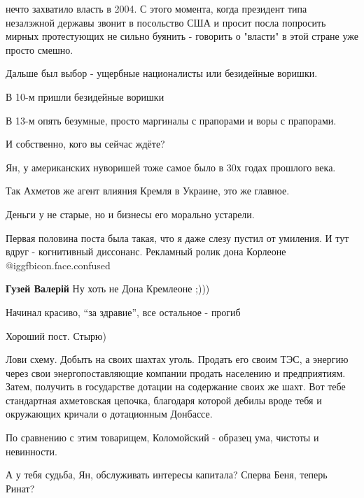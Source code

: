 \begin{itemize}
\begin{itemize}
нечто захватило власть в 2004. С этого момента, когда президент типа незалэжной
державы звонит в посольство США и просит посла попросить мирных протестующих не
сильно буянить - говорить о "власти" в этой стране уже просто смешно.

Дальше был выбор - ущербные националисты или безидейные воришки.

В 10-м пришли безидейные воришки

В 13-м опять безумные, просто маргиналы с прапорами и воры с прапорами.

И собственно, кого вы сейчас ждёте?

\end{itemize} %

Ян, у американских нуворишей тоже самое было в 30х годах прошлого века.


Так Ахметов же агент влияния Кремля в Украине, это же главное.

Деньги у не старые, но и бизнесы его морально устарели.


Первая половина поста была такая, что я даже слезу пустил от умиления. И тут
вдруг - когнитивный диссонанс. Рекламный ролик дона Корлеоне  @igg{fbicon.face.confused} 

\begin{itemize} %
\textbf{Гузей Валерій}
Ну хоть не Дона Кремлеоне ;)))
\end{itemize} %

Начинал красиво, \enquote{за здравие}, все остальное - прогиб

Хороший пост.
Стырю)


Лови схему. Добыть на своих шахтах уголь. Продать его своим ТЭС, а энергию
через свои энергопоставляющие компании продать населению и предприятиям. Затем,
получить в государстве дотации на содержание своих же шахт. Вот тебе
стандартная ахметовская цепочка, благодаря которой дебилы вроде тебя и
окружающих кричали о дотационным Донбассе.

По сравнению с этим товарищем, Коломойский - образец ума, чистоты и невинности.

А у тебя судьба, Ян, обслуживать интересы капитала? Сперва Беня, теперь Ринат?


\end{itemize}

